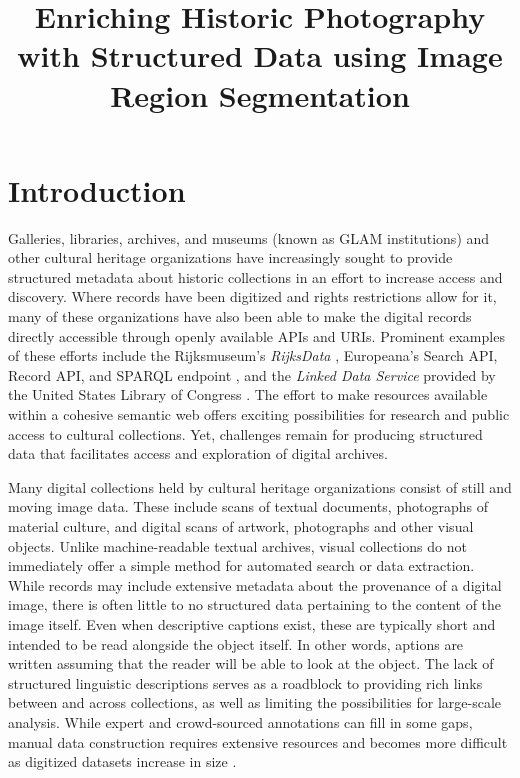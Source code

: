 \documentclass[10pt, a4paper]{article}
\title{\textbf{Enriching Historic Photography with Structured Data
using Image Region Segmentation}}
\begin{document}
\maketitleabstract

\section{Introduction}

Galleries, libraries, archives, and museums (known as GLAM institutions) and
other cultural heritage organizations have
increasingly sought to provide structured metadata about historic collections
in an effort to increase access and discovery. Where records have been
digitized and rights restrictions allow for it, many of these organizations
have also been able to make the digital records directly accessible through
openly available APIs and URIs. Prominent examples of these efforts include the
Rijksmuseum's \textit{RijksData} \cite{dijkshoorn2018rijksmuseum}, Europeana's
Search API, Record API, and SPARQL endpoint \cite{concordia2009not}, and the
\textit{Linked Data Service} provided by the United States Library of Congress
\cite{zimmer2015twitter}. The effort to make resources available
within a cohesive semantic web offers exciting possibilities for research and
public access to cultural collections. Yet, challenges remain for producing
structured data that facilitates access and exploration of digital archives.

Many digital collections held by cultural heritage organizations consist of
still and moving image data. These include scans of textual documents,
photographs of material culture, and digital scans of artwork,
photographs and other visual objects. Unlike machine-readable textual archives,
visual collections do not immediately offer a simple method for automated
search or data extraction. While records may include extensive metadata
about the provenance of a digital image, there is often little to no structured data
pertaining to the content of the image itself. Even when descriptive captions
exist, these are typically short and intended to be read alongside the object itself.
In other words, aptions are written assuming that the reader will be able to look
at the object. The lack of
structured linguistic descriptions serves as a roadblock to providing rich links
between and across collections, as well as limiting the possibilities for
large-scale analysis. While expert and crowd-sourced annotations
can fill in some gaps, manual data construction requires extensive resources
and becomes more difficult as digitized datasets increase in size
\cite{seitsonen2017crowdsourcing}.
\end{document}
